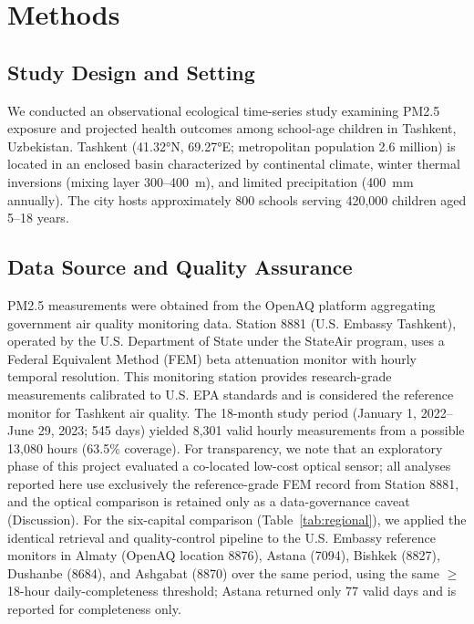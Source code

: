 \documentclass[11pt,a4paper]{article}
\begin{document}
\section{Methods}

\subsection{Study Design and Setting}

We conducted an observational ecological time-series study examining PM2.5 exposure and projected health outcomes among school-age children in Tashkent, Uzbekistan. Tashkent (41.32°N, 69.27°E; metropolitan population 2.6 million) is located in an enclosed basin characterized by continental climate, winter thermal inversions (mixing layer 300--400~m), and limited precipitation (400~mm annually). The city hosts approximately 800 schools serving 420,000 children aged 5--18 years.

\subsection{Data Source and Quality Assurance}

PM2.5 measurements were obtained from the OpenAQ platform aggregating government air quality monitoring data. Station 8881 (U.S. Embassy Tashkent), operated by the U.S. Department of State under the StateAir program, uses a Federal Equivalent Method (FEM) beta attenuation monitor with hourly temporal resolution. This monitoring station provides research-grade measurements calibrated to U.S. EPA standards and is considered the reference monitor for Tashkent air quality. The 18-month study period (January 1, 2022--June 29, 2023; 545 days) yielded 8,301 valid hourly measurements from a possible 13,080 hours (63.5\% coverage). For transparency, we note that an exploratory phase of this project evaluated a co-located low-cost optical sensor; all analyses reported here use exclusively the reference-grade FEM record from Station 8881, and the optical comparison is retained only as a data-governance caveat (Discussion). For the six-capital comparison (Table~\ref{tab:regional}), we applied the identical retrieval and quality-control pipeline to the U.S. Embassy reference monitors in Almaty (OpenAQ location 8876), Astana (7094), Bishkek (8827), Dushanbe (8684), and Ashgabat (8870) over the same period, using the same $\geq$18-hour daily-completeness threshold; Astana returned only 77 valid days and is reported for completeness only.
\end{document}
